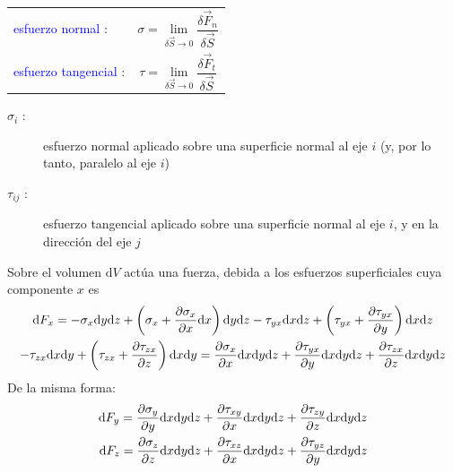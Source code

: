 	\begin{tabular}{ll}
		\textcolor{blue}{esfuerzo normal} : & \begin{minipage}{10cm}$$\sigma = \lim_{\delta \vec S \rightarrow 0} \frac{\delta \vec F_n}{\delta \vec S}$$\end{minipage} \\
		\textcolor{blue}{esfuerzo tangencial} : & \begin{minipage}{10cm}$$\tau = \lim_{\delta \vec S \rightarrow 0} \frac{\delta \vec F_t}{\delta \vec S}$$ \end{minipage}\\
	\end{tabular}

\begin{description}
	\item[$\sigma_i$ :] esfuerzo normal aplicado sobre una superficie normal al eje $i$ (y, por lo tanto, paralelo al eje $i$)
	\item[$\tau_{ij}$ :] esfuerzo tangencial aplicado sobre una superficie normal al eje $i$, y en la direcci\'on del eje $j$
\end{description} 

\begin{center}
%	

\end{center}

Sobre el volumen $\text{d} V$ act\'ua una fuerza, debida a los esfuerzos superficiales cuya componente $x$ es
\begin{multline}
	\text{d} F_x = -\sigma_x  \text{d} y \text{d} z + \left(\sigma_x + \frac{\partial \sigma_x}{\partial x} \text{d} x\right) \text{d} y \text{d} z - \tau_{yx} \text{d} x \text{d} z + \left(\tau_{yx} + \frac{\partial \tau_{yx}}{\partial y}\right) \text{d} x \text{d} z \\
	- \tau_{zx} \text{d} x \text{d} y + \left(\tau_{zx} + \frac{\partial \tau_{zx}}{\partial z}\right) \text{d} x \text{d} y
	= \frac{\partial \sigma_x}{\partial x} \text{d} x \text{d} y \text{d} z + \frac{\partial \tau_{yx}}{\partial y} \text{d} x \text{d} y \text{d} z + \frac{\partial \tau_{zx}}{\partial z}
	\text{d} x \text{d} y \text{d} z
\end{multline}
De la misma forma:
\begin{eqnarray}
	\text{d} F_y = \frac{\partial \sigma_y}{\partial y} \text{d} x \text{d} y \text{d} z + \frac{\partial \tau_{xy}}{\partial x} \text{d} x \text{d} y \text{d} z + \frac{\partial \tau_{zy}}{\partial z} \text{d} x \text{d} y \text{d} z \\
	\text{d} F_z = \frac{\partial \sigma_z}{\partial z} \text{d} x \text{d} y \text{d} z + \frac{\partial \tau_{xz}}{\partial x} \text{d} x \text{d} y \text{d} z + \frac{\partial \tau_{yz}}{\partial y} \text{d} x \text{d} y \text{d} z
\end{eqnarray}

